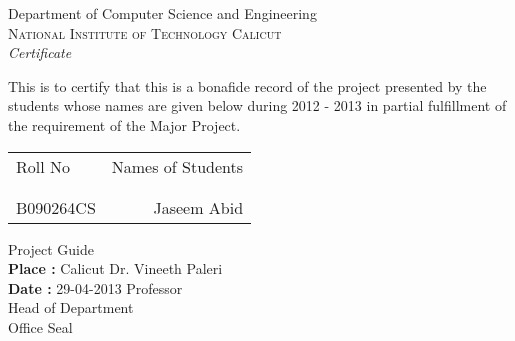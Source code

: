 \newpage
\thispagestyle{empty}

\begin{center}

\huge{Department of Computer Science and Engineering}\\[0.5cm]
\normalsize
\textsc{National Institute of Technology Calicut}\\[2.0cm]

\emph{\LARGE Certificate}\\[2.5cm]
\end{center}
\normalsize
This is to certify that this is a bonafide record of the project presented by
the students whose names are given below during 2012 - 2013 in partial
fulfillment of the requirement
of the Major Project.\\[1.0cm]

\begin{table}[h]
\centering
\begin{tabular}{lr}
Roll No & Names of Students \\ \\ \hline
\\
B090264CS & Jaseem Abid
\end{tabular}
\end{table}

\vspace*{1.0cm}
\noindent

\hfill Project Guide\\
\textbf{Place :} Calicut \hfill Dr. Vineeth Paleri\\
\textbf{Date :} 29-04-2013 \hfill Professor\\

\vspace*{1.0cm}
\hfill Head of Department\\

\vspace*{1.5cm}
\hfill Office Seal

\nopagebreak
